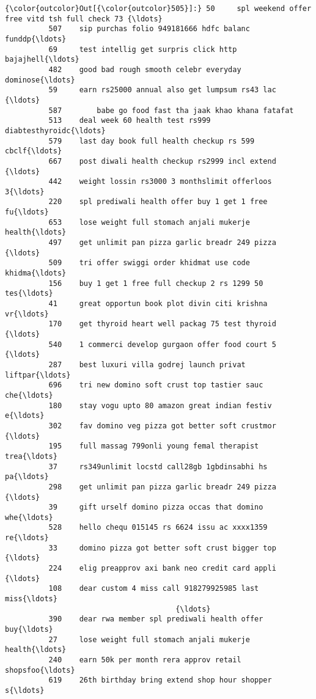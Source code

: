 \documentclass[11pt]{article}
\begin{document}
\begin{Verbatim}[commandchars=\\\{\}]
{\color{outcolor}Out[{\color{outcolor}505}]:} 50     spl weekend offer free vitd tsh full check 73 {\ldots}
          507    sip purchas folio 949181666 hdfc balanc funddp{\ldots}
          69     test intellig get surpris click http bajajhell{\ldots}
          482    good bad rough smooth celebr everyday dominose{\ldots}
          59     earn rs25000 annual also get lumpsum rs43 lac {\ldots}
          587        babe go food fast tha jaak khao khana fatafat
          513    deal week 60 health test rs999 diabtesthyroidc{\ldots}
          579    last day book full health checkup rs 599 cbclf{\ldots}
          667    post diwali health checkup rs2999 incl extend {\ldots}
          442    weight lossin rs3000 3 monthslimit offerloos 3{\ldots}
          220    spl prediwali health offer buy 1 get 1 free fu{\ldots}
          653    lose weight full stomach anjali mukerje health{\ldots}
          497    get unlimit pan pizza garlic breadr 249 pizza {\ldots}
          509    tri offer swiggi order khidmat use code khidma{\ldots}
          156    buy 1 get 1 free full checkup 2 rs 1299 50 tes{\ldots}
          41     great opportun book plot divin citi krishna vr{\ldots}
          170    get thyroid heart well packag 75 test thyroid {\ldots}
          540    1 commerci develop gurgaon offer food court 5 {\ldots}
          287    best luxuri villa godrej launch privat liftpar{\ldots}
          696    tri new domino soft crust top tastier sauc che{\ldots}
          180    stay vogu upto 80 amazon great indian festiv e{\ldots}
          302    fav domino veg pizza got better soft crustmor {\ldots}
          195    full massag 799onli young femal therapist trea{\ldots}
          37     rs349unlimit locstd call28gb 1gbdinsabhi hs pa{\ldots}
          298    get unlimit pan pizza garlic breadr 249 pizza {\ldots}
          39     gift urself domino pizza occas that domino whe{\ldots}
          528    hello chequ 015145 rs 6624 issu ac xxxx1359 re{\ldots}
          33     domino pizza got better soft crust bigger top {\ldots}
          224    elig preapprov axi bank neo credit card appli {\ldots}
          108    dear custom 4 miss call 918279925985 last miss{\ldots}
                                       {\ldots}                        
          390    dear rwa member spl prediwali health offer buy{\ldots}
          27     lose weight full stomach anjali mukerje health{\ldots}
          240    earn 50k per month rera approv retail shopsfoo{\ldots}
          619    26th birthday bring extend shop hour shopper s{\ldots}

\end{Verbatim}
\end{document}
